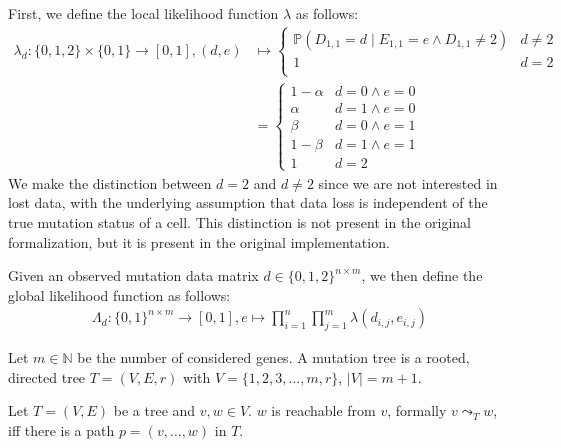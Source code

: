 \begin{definition}
    \label{def:likelihood}
    First, we define the local likelihood function $\lambda$ as follows:
    \begin{align*}
        \lambda_d: \{0, 1, 2\} \times \{0, 1\} \rightarrow [0, 1], (d, e) &\mapsto \begin{cases}
            \mathbb{P}(D_{1,1} = d \mid E_{1,1} = e \wedge D_{1,1} \neq 2) & d \neq 2 \\
            1 & d = 2 \\
        \end{cases} \\
        &= \begin{cases}
            1-\alpha & d = 0 \wedge e = 0 \\
            \alpha & d = 1 \wedge e = 0 \\
            \beta & d = 0 \wedge e = 1 \\
            1-\beta & d = 1 \wedge e = 1 \\
            1 & d = 2
        \end{cases}
    \end{align*}
    We make the distinction between $d = 2$ and $d \neq 2$ since we are not interested in lost data, with the underlying assumption that data loss is independent of the true mutation status of a cell. This distinction is not present in the original formalization, but it is present in the original implementation. 

    Given an observed mutation data matrix $d \in \{0,1,2\}^{n \times m}$, we then define the global likelihood function as follows:
    \begin{align*}
        \Lambda_d : \{0,1\}^{n \times m} \rightarrow [0,1], e \mapsto \prod_{i = 1}^{n} \prod_{j = 1}^{m} \lambda(d_{i,j}, e_{i,j})
    \end{align*}
\end{definition}

\begin{definition}
    \label{def:mutation_tree}
    Let $m \in \mathbb{N}$ be the number of considered genes. A mutation tree is a rooted, directed tree $T = (V, E, r)$ with $V = \{1, 2, 3, \dots, m, r\}$, $|V| = m+1$.
\end{definition}

\begin{definition}
    \label{def:reachability}
    Let $T = (V, E)$ be a tree and $v, w \in V$. $w$ is reachable from $v$, formally $v \leadsto_T w$, iff there is a path $p = (v, \dots, w)$ in $T$.
\end{definition}

